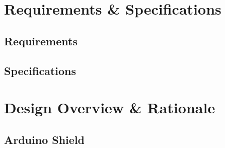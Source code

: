 \documentclass[twoside]{article}
\begin{document}
\section{Requirements \& Specifications}
    \subsection{Requirements}
    \subsection{Specifications}

\section{Design Overview \& Rationale}
    \subsection{Arduino Shield}
\end{document}
